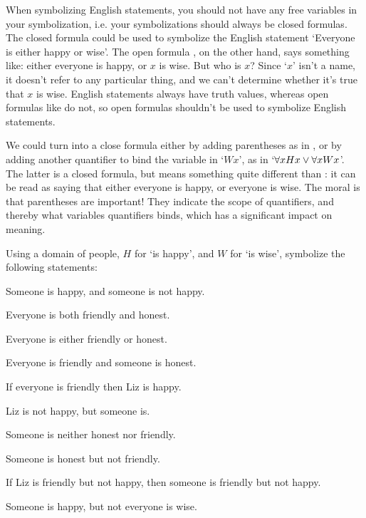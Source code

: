 When symbolizing English statements, you should not have any free variables in your symbolization, i.e. your symbolizations should always be closed formulas. The closed formula  could be used to symbolize the English statement `Everyone is either happy or wise'.  The open formula , on the other hand, says something like: either everyone is happy, or $x$ is wise.  But who is $x$?  Since `$x$' isn't a name, it doesn't refer to any particular thing, and we can't determine whether it's true that $x$ is wise.   English statements always have truth values, whereas open formulas like  do not, so open formulas shouldn't be used to symbolize English statements.

We could turn  into a close formula either by adding parentheses as in , or by adding another quantifier to bind the variable in `$Wx$', as in `$\forall x Hx \vee \forall xWx$'.  The latter is  a closed formula, but means something quite different than : it can be read as saying that either everyone is happy, or everyone is wise.  The moral is that parentheses are important! They indicate the scope of quantifiers, and thereby what variables quantifiers binds, which has a significant impact on meaning.
\practiceproblems

\problempart Using a domain of people, $H$ for `\blank is happy', and $W$ for `\blank is wise', symbolize the following statements:

\begin{earg}
\item Someone is happy, and someone is not happy.
\item Everyone is both friendly and honest.
\item Everyone is either friendly or honest.
\item Everyone is friendly and someone is honest.
\item If everyone is friendly then Liz is happy.
\item Liz is not happy, but someone is.
\item Someone is neither honest nor friendly.
\item Someone is honest but not friendly.
\item If Liz is friendly but not happy, then someone is friendly but not happy.
\item Someone is happy, but not everyone is wise.
\end{earg}




